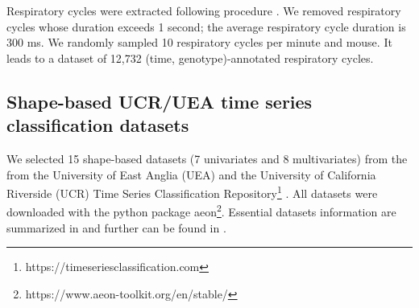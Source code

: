 Respiratory cycles were extracted following procedure \cite{germain2023unsupervised}. We removed 
respiratory cycles whose duration exceeds 1 second; the average respiratory cycle duration is 
300 ms. We randomly sampled 10 respiratory cycles per minute and mouse. It leads to a dataset of 
12,732 (time, genotype)-annotated respiratory cycles. 

\subsection{Shape-based UCR/UEA time series classification datasets}
\label{appendix:classification_dataset}
We selected 15 shape-based datasets (7 univariates and 8 multivariates) from the from the University of East Anglia (UEA) and the University of California Riverside (UCR) Time Series Classification Repository\footnote{https://timeseriesclassification.com} \cite{dau2019ucr,bagnall2018uea}. All datasets were downloaded with the python package aeon\footnote{https://www.aeon-toolkit.org/en/stable/}. Essential datasets information are summarized in  and further can be found in \cite{dau2019ucr,bagnall2018uea}.

\begin{table}[hbt!]
  \centering
  \caption{UCR/UEA shape-based time series datasets for classification.}
  \label{appendix:table:datasets}
\end{table}

